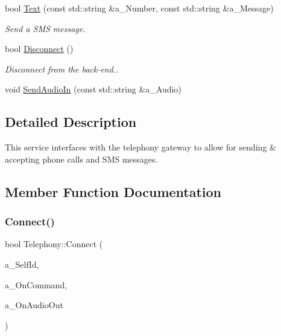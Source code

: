 \begin{DoxyCompactItemize}
bool \hyperlink{class_telephony_a4dae6da4af340f564eca72fbdc1ea68a}{Text} (const std\+::string \&a\+\_\+\+Number, const std\+::string \&a\+\_\+\+Message)
\begin{DoxyCompactList}\small\item\em Send a S\+MS message. \end{DoxyCompactList}\item 
\mbox{\label{class_telephony_abbdf8f6968f3761b3b699aec89ebd107}} 
bool \hyperlink{class_telephony_abbdf8f6968f3761b3b699aec89ebd107}{Disconnect} ()
\begin{DoxyCompactList}\small\item\em Disconnect from the back-\/end.. \end{DoxyCompactList}\item 
void \hyperlink{class_telephony_a7e6fb76a0d470cce05e70560e3a0f338}{Send\+Audio\+In} (const std\+::string \&a\+\_\+\+Audio)
\end{DoxyCompactItemize}


\subsection{Detailed Description}
This service interfaces with the telephony gateway to allow for sending \& accepting phone calls and S\+MS messages. 

\subsection{Member Function Documentation}
\mbox{\label{class_telephony_aa419e85950a323e88bf8b0123a8bd56e}} 
\subsubsection{\texorpdfstring{Connect()}{Connect()}}
{\footnotesize\ttfamily bool Telephony\+::\+Connect (\begin{DoxyParamCaption}\item[{const std\+::string \&}]{a\+\_\+\+Self\+Id,  }\item[{\hyperlink{class_telephony_ab5c5a24d45eb0612478a26dfbf11a168}{On\+Command}}]{a\+\_\+\+On\+Command,  }\item[{On\+Audio\+Out}]{a\+\_\+\+On\+Audio\+Out }\end{DoxyParamCaption})}

